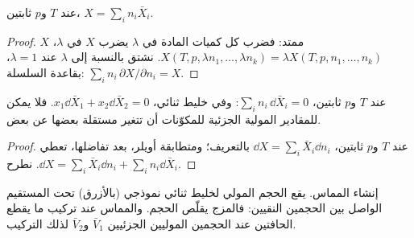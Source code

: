 \begin{theorem}\label{thm:b2:chemical-potential:euler}
عند $T$ و$p$ ثابتين، $X = \sum_i n_i\bar X_i$.
\end{theorem}

\begin{proof}
$X$ ممتد: فضرب كل كميات المادة في $\lambda$ يضرب $X$ في
$\lambda$، $X(T, p, \lambda n_1, \dots, \lambda n_k) = \lambda X(T, p, n_1,
\dots, n_k)$. نشتق بالنسبة إلى $\lambda$ عند $\lambda = 1$، بقاعدة
السلسلة: $\sum_i n_i\,\partial X/\partial n_i = X$.
\end{proof}

\begin{proposition}\label{prop:b2:chemical-potential:gibbs-duhem}
عند $T$ و$p$ ثابتين، $\sum_i n_i\,\dd\bar X_i = 0$: وفي خليط ثنائي،
$x_1\dd\bar X_1 + x_2\dd\bar X_2 = 0$. فلا يمكن للمقادير المولية الجزئية
للمكوّنات أن تتغير مستقلة بعضها عن بعض.
\end{proposition}

\begin{proof}
عند $T$ و$p$ ثابتين، $\dd X = \sum_i\bar X_i\dd n_i$ بالتعريف؛ ومتطابقة
أويلر، بعد تفاضلها، تعطي $\dd X = \sum_i\bar X_i\dd n_i + \sum_i
n_i\dd\bar X_i$. نطرح.
\end{proof}

\begin{omfigure}

{\small إنشاء المماس. يقع الحجم المولي لخليط ثنائي نموذجي (بالأزرق) تحت
المستقيم الواصل بين الحجمين النقيين: فالمزج يقلّص الحجم. والمماس عند تركيب
ما يقطع الحافتين عند الحجمين الموليين الجزئيين $\bar V_1$ و$\bar V_2$ لذلك
التركيب.}
\end{omfigure}

